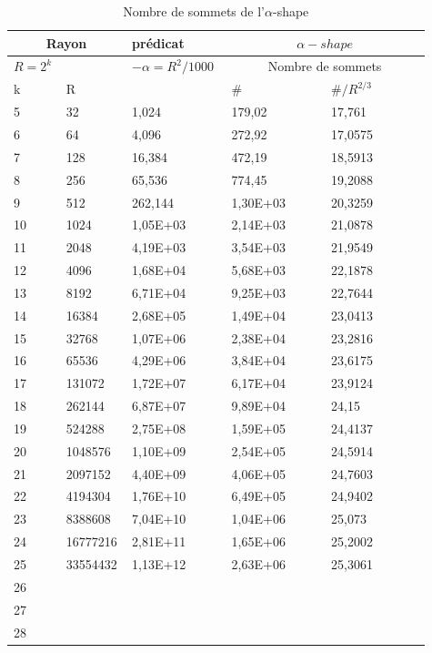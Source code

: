 \begin{table}[H]
  \begin{tabular}{|p{0.09\linewidth}|p{0.13\linewidth}||p{0.23\linewidth}||p{0.23\linewidth}|p{0.23\linewidth}|}
    \hline
    \multicolumn{2}{|c||}{Rayon} & prédicat               & \multicolumn{2}{|c|}{$\alpha-shape$} \\  \hline 
    $R=2^k$  &                   & $-\alpha = R^{2}/1000$ & \multicolumn{2}{|c|}{Nombre de sommets} \\ \hline
    k        & R                 &                        & \# & $\# / R^{2/3}$ \\ 
    \hline
    5 & 32 & 1,024 & 179,02 & 17,761\\
    6 & 64 & 4,096 & 272,92 & 17,0575\\
    7 & 128 & 16,384 & 472,19 & 18,5913\\
    8 & 256 & 65,536 & 774,45 & 19,2088\\
    9 & 512 & 262,144 & 1,30E+03 & 20,3259\\
    10 & 1024 & 1,05E+03 & 2,14E+03 & 21,0878\\
    11 & 2048 & 4,19E+03 & 3,54E+03 & 21,9549\\
    12 & 4096 & 1,68E+04 & 5,68E+03 & 22,1878\\
    13 & 8192 & 6,71E+04 & 9,25E+03 & 22,7644\\
    14 & 16384 & 2,68E+05 & 1,49E+04 & 23,0413\\
    15 & 32768 & 1,07E+06 & 2,38E+04 & 23,2816\\
    16 & 65536 & 4,29E+06 & 3,84E+04 & 23,6175\\
    17 & 131072 & 1,72E+07 & 6,17E+04 & 23,9124\\
    18 & 262144 & 6,87E+07 & 9,89E+04 & 24,15\\
    19 & 524288 & 2,75E+08 & 1,59E+05 & 24,4137\\
    20 & 1048576 & 1,10E+09 & 2,54E+05 & 24,5914\\
    21 & 2097152 & 4,40E+09 & 4,06E+05 & 24,7603\\
    22 & 4194304 & 1,76E+10 & 6,49E+05 & 24,9402\\
    23 & 8388608 & 7,04E+10 & 1,04E+06 & 25,073\\
    24 & 16777216 & 2,81E+11 & 1,65E+06 & 25,2002\\
    25 & 33554432 & 1,13E+12 & 2,63E+06 & 25,3061\\
    26 &  &  &  & \\
    27 &  &  &  &  \\
    28 &  &  &  &  \\
    \hline
  \end{tabular} 
  \caption{Nombre de sommets de l'$\alpha$-shape}
\end{table}


